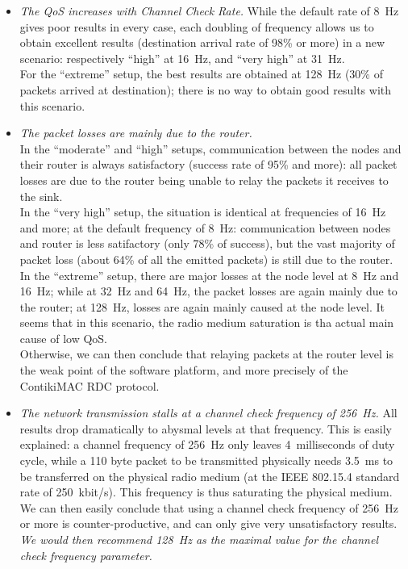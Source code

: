 \documentclass[a4paper,twoside]{article}
\begin{document}
\begin{itemize}

\item \emph{The QoS increases with Channel Check Rate.} While the default
rate of 8~Hz gives poor results in every case, each doubling of frequency
allows us to obtain excellent results (destination arrival rate of 98\%
or more) in a new scenario: respectively ``high'' at 16~Hz, and ``very
high'' at 31~Hz.\\
For the ``extreme'' setup, the best results are obtained at 128~Hz
(30\% of packets arrived at destination); there is no way to obtain
good results with this scenario.

\item \emph{The packet losses are mainly due to the router.}\\
In the ``moderate'' and ``high'' setups, communication between the nodes
and their router is always satisfactory (success rate of 95\% and more):
all packet losses are due to the router being unable to relay the packets
it receives to the sink.\\
In the ``very high'' setup, the situation is identical at frequencies
of 16~Hz and more; at the default frequency of 8~Hz: communication between
nodes and router is less satifactory (only 78\% of success), but the vast
majority of packet loss (about 64\% of all the emitted packets) is still
due to the router.\\
In the ``extreme'' setup, there are major losses at the node level at 8~Hz
and 16~Hz; while at 32~Hz and 64~Hz, the packet losses are again mainly due
to the router; at 128~Hz, losses are again mainly caused at the node level.
It seems that in this scenario, the radio medium saturation is tha actual
main cause of low QoS.\\
Otherwise, we can then conclude that relaying packets at the router level
is the weak point of the software platform, and more precisely of the
ContikiMAC RDC protocol.

\item \emph{The network transmission stalls at a channel check frequency
of 256~Hz.} All results drop dramatically to abysmal levels at that
frequency. This is easily explained: a channel frequency of 256~Hz only
leaves 4~milliseconds of duty cycle, while a 110 byte packet to be
transmitted physically needs 3.5~ms to be transferred on the physical
radio medium (at the IEEE 802.15.4 standard rate of 250~kbit/s).
This frequency is thus saturating the physical medium. We can then easily
conclude that using a channel check frequency of 256~Hz or more is
counter-productive, and can only give very unsatisfactory results.\\
\emph{We would then recommend 128~Hz as the maximal value for the channel
check frequency parameter.}

\end{itemize}
\end{document}
